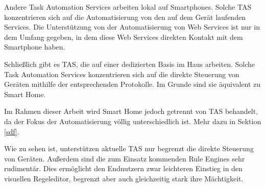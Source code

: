 \documentclass[12pt]{article}
\begin{document}
Andere Task Automation Services arbeiten lokal auf Smartphones. Solche TAS konzentrieren sich auf die Automatisierung von den auf dem Gerät laufenden Services. Die Unterstützung von der Automatisierung von Web Services ist nur in dem Umfang gegeben, in dem diese Web Services direkten Kontakt mit dem Smartphone haben.

Schließlich gibt es TAS, die auf einer dedizierten Basis im Haus arbeiten. Solche Task Automation Services konzentrieren sich auf die direkte Steuerung von Geräten mithilfe der entsprechenden Protokolle. Im Grunde sind sie äquivalent zu Smart Home. 

Im Rahmen dieser Arbeit wird Smart Home jedoch getrennt von TAS behandelt, da der Fokus der Automatisierung völlig unterschiedlich ist. Mehr dazu in Sektion \ref{sdf}.

Wie zu sehen ist, unterstützen aktuelle TAS nur begrenzt die direkte Steuerung von Geräten. Außerdem sind die zum Einsatz kommenden Rule Engines sehr rudimentär. Dies ermöglicht den Endnutzern zwar leichteren Einstieg in den visuellen Regeleditor, begrenzt aber auch gleichzeitig stark ihre Mächtigkeit. 





\end{document}
